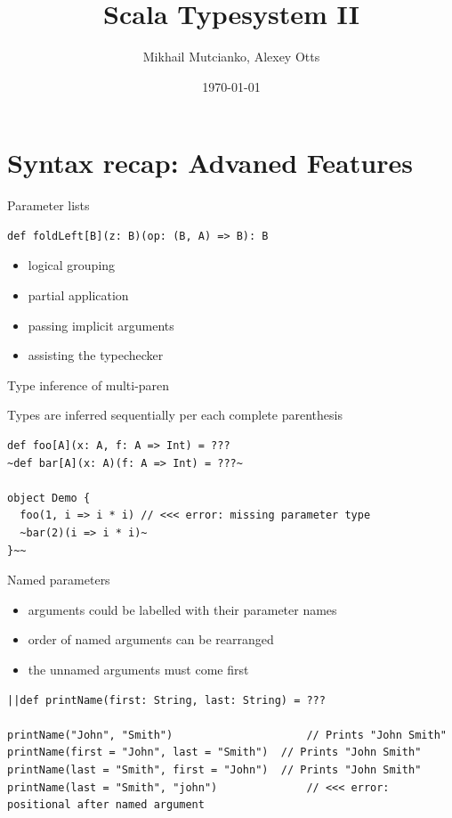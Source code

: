 \documentclass[aspectratio=169]{beamer}
\title{Scala Typesystem II}
\author{Mikhail Mutcianko, Alexey Otts}
\institute{СПБгУ, СП}
\date{\today}
\begin{document}
\frame{\titlepage}

\section{Syntax recap: Advaned Features}

\begin{frame}[fragile]{Parameter lists}
\begin{lstlisting}[style=scala]
def foldLeft[B](z: B)(op: (B, A) => B): B
\end{lstlisting}
\begin{itemize}
  \item logical grouping
  \item partial application
  \item passing implicit arguments
  \item assisting the typechecker
\end{itemize}
\end{frame}

\begin{frame}[fragile]{Type inference of multi-paren}
  \begin{block}{}
    Types are inferred sequentially per \alert{each complete} parenthesis
  \end{block}
  \vspace{2em}
\begin{lstlisting}[style=scala]
def foo[A](x: A, f: A => Int) = ???
~def bar[A](x: A)(f: A => Int) = ???~

object Demo {
  foo(1, i => i * i) // <<< error: missing parameter type
  ~bar(2)(i => i * i)~
}~~
\end{lstlisting}
\end{frame}

\begin{frame}[fragile]{Named parameters}
\begin{itemize}
  \item arguments could be labelled with their parameter names
  \item order of named arguments can be rearranged
  \item the unnamed arguments must come first
\end{itemize}
\pause
\vspace{2em}
\begin{lstlisting}[style=scala]
||def printName(first: String, last: String) = ???

printName("John", "Smith")                     // Prints "John Smith"
printName(first = "John", last = "Smith")  // Prints "John Smith"
printName(last = "Smith", first = "John")  // Prints "John Smith"
printName(last = "Smith", "john")              // <<< error: positional after named argument
\end{lstlisting}
\end{frame}
\end{document}
